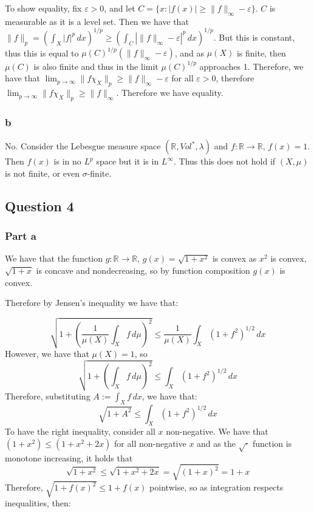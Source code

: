 \documentclass{article}
\theoremstyle{definition}
\numberwithin{theorem}{section}
\numberwithin{equation}{section}
\begin{document}
To show equality, fix $\varepsilon > 0$, and let $C = \lbrace x : |f(x)| \geq \| f \|_{\infty} - \varepsilon \rbrace$. $C$ is measurable as it is a level set. Then we have that $ \|f \|_p = \left(\int_X |f|^p \, dx \right)^{1/p} \geq \left(\int_C |\| f \|_{\infty} - \varepsilon|^p \, dx \right)^{1/p}$. But this is constant, thus this is equal to $\mu(C)^{1/p}( \| f \|_{\infty} - \varepsilon)$, and as $\mu(X)$ is finite, then $\mu(C)$ is also finite and thus in the limit $\mu(C)^{1/p}$ approaches 1. Therefore, we have that $\lim_{p \rightarrow \infty} \| f \chi_X \|_p \geq \|f \|_{\infty} - \varepsilon$ for all $\varepsilon > 0$, therefore$\lim_{p \rightarrow \infty} \| f \chi_X \|_p \geq \|f \|_{\infty}$. Therefore we have equality.
\subsubsection*{b}
No. Consider the Lebesgue measure space $(\mathbb{R}, Vol^*, \lambda)$ and $f : \mathbb{R} \rightarrow \mathbb{R}$, $f(x) = 1$. Then $f(x)$ is in no $L^p$ space but it is in $L^\infty$. Thus this does not hold if $(X, \mu)$ is not finite, or even $\sigma$-finite. 
\subsection*{Question 4}
\subsubsection*{Part a}
We have that the function $g: \mathbb{R} \rightarrow \mathbb{R}$, $g(x) = \sqrt{1 + x^2}$ is convex as $x^2$ is convex, $\sqrt{1 + x}$ is concave and nondecreasing, so by function composition $g(x)$ is convex. 

Therefore by Jensen's inequality we have that:

\begin{equation}
	\sqrt{1 + \left(\frac{1}{\mu(X)} \int_X f \, d\mu\right)^2} \leq \frac{1}{\mu(X)} \int_X \left(1 + f^2\right)^{1/2} \, dx
\end{equation}
However, we have that $\mu(X) = 1$, so 
\begin{equation}
	\sqrt{1 + \left( \int_X f \, d\mu\right)^2} \leq \int_X \left(1 + f^2\right)^{1/2} \, dx
\end{equation}
Therefore, substituting $A := \int_X f \, dx$, we have that:
\begin{equation}
	\sqrt{1 + A^2} \leq \int_X \left(1 + f^2\right)^{1/2} \, dx
\end{equation}
To have the right inequality, consider all $x$ non-negative. We have that $(1 + x^2) \leq (1 + x^2 + 2x)$ for all non-negative $x$ and as the $\sqrt{ \cdot }$ function is monotone increasing, it holds that
\begin{equation}
	\sqrt{1 + x^2} \leq \sqrt{1 + x^2 + 2x} = \sqrt{(1 + x)^2} = 1 + x
\end{equation}
Therefore, $\sqrt{1 + f(x)^2} \leq 1 + f(x)$ pointwise, so as integration respects inequalities, then:
\end{document}
